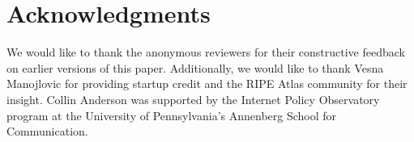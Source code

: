 \section*{Acknowledgments}

We would like to thank the anonymous reviewers for their constructive feedback on earlier versions of this paper. Additionally, we would like to thank Vesna Manojlovic for providing startup credit and the RIPE Atlas community for their insight. Collin Anderson was supported by the Internet Policy Observatory program at the University of Pennsylvania's Annenberg School for Communication.